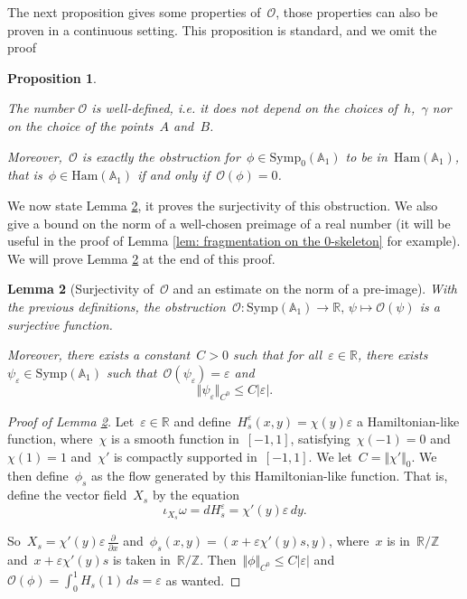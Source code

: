 \documentclass[10pt]{amsart}
\newtheorem{prop}{Proposition}[section]
\newtheorem{lemma}[prop]{Lemma}
\newcommand{\Sympoc}{\mathrm{Symp}_{0}}
\newcommand{\Sympc}{\mathrm{Symp}}
\newcommand{\Ham}{\mathrm{Ham}}
\begin{document}
The next proposition gives some properties of~$\mathcal{O}$, those properties can also be proven in a continuous setting. This proposition is standard, and we omit the proof

\begin{prop}\label{prop: Properties of O}

The number $\mathcal{O}$ is well-defined, i.e. it does not depend on the choices of~$h$,~$\gamma$ nor on the choice of the points~$A$ and~$B$.

Moreover,~$\mathcal{O}$ is exactly the obstruction for~$\phi\in \Sympoc(\mathbb{A}_1)$ to be in~$\Ham(\mathbb{A}_1)$, that is~$\phi \in \Ham(\mathbb{A}_1)$ if and only if~$\mathcal{O}(\phi)=0$.
\end{prop}

We now state Lemma \ref{lem: surjectivity of O}, it proves the surjectivity of this obstruction. We also give a bound on the norm of a well-chosen preimage of a real number (it will be useful in the proof of Lemma \ref{lem: fragmentation on the 0-skeleton} for example). We will prove Lemma \ref{lem: surjectivity of O} at the end of this proof.

\begin{lemma}[Surjectivity of~$\mathcal{O}$ and an estimate on the norm of a pre-image]\label{lem: surjectivity of O}
With the previous definitions, the obstruction~$\mathcal{O}: \Sympc(\mathbb{A}_1)\rightarrow\mathbb{R}, \, \psi \mapsto \mathcal{O}(\psi)$ is a surjective function. 
	
Moreover, there exists a constant~$C>0$ such that for all~$\varepsilon \in \mathbb{R}$, there exists~$\psi_{\varepsilon}\in \Sympc(\mathbb{A}_1)$ such that~$\mathcal{O}(\psi_{\varepsilon})=\varepsilon$ and~$$\Vert \psi_{\varepsilon} \Vert_{C^0}\leq C\vert \varepsilon\vert.$$
\end{lemma}

\begin{proof}[Proof of Lemma \ref{lem: surjectivity of O}]
Let~$\varepsilon\in \mathbb{R}$ and define~$H_s^\varepsilon(x,y)= \chi(y)\varepsilon$ a Hamiltonian-like function, where~$\chi$ is a smooth function in~$[-1,1]$, satisfying~$\chi(-1)=0$ and~$\chi(1)=1$ and~$\chi'$ is compactly supported in~$[-1,1]$. We let~$C=\Vert\chi'\Vert_0$. We then define~$\phi_s$ as the flow generated by this Hamiltonian-like function. That is, define the vector field~$X_s$ by the equation
$$\iota_{X_s}\omega=dH_s^\varepsilon=\chi'(y)\varepsilon \,dy.$$

So~$X_s=\chi'(y)\varepsilon \, \frac{\partial}{\partial x}$ and~$\phi_s(x,y)=(x+\varepsilon \chi'(y) s, y)$, where~$x$ is in~$\mathbb{R}/\mathbb{Z}$ and~$x+\varepsilon \chi'(y) s$ is taken in~$\mathbb{R}/\mathbb{Z}$. Then~$\Vert\phi\Vert_{C^0}\leq C \vert\varepsilon\vert$ and~$\mathcal{O}(\phi)=\int_0^1 H_s(1)\, ds=\varepsilon$ as wanted.
\end{proof}
\end{document}
